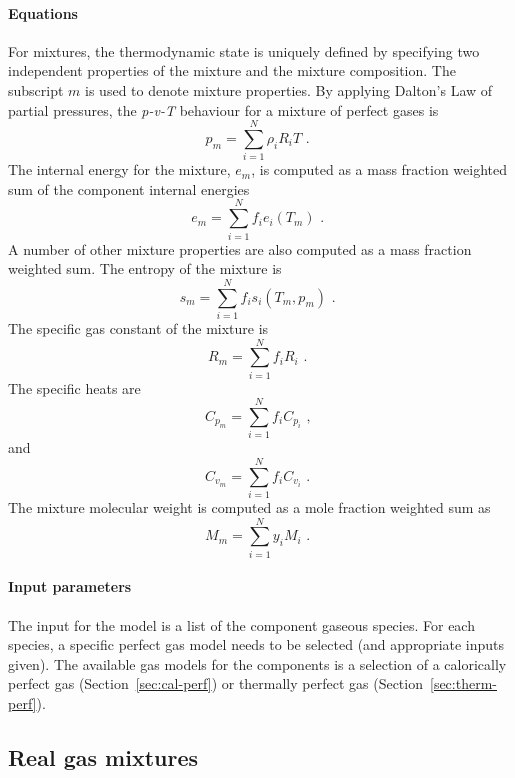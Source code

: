 \paragraph{Equations}
For mixtures, the thermodynamic state is uniquely defined
by specifying two independent properties of the mixture and the mixture
composition.
The subscript $m$ is used to denote mixture properties.
By applying Dalton's Law of partial pressures, the
\textit{p-v-T} behaviour for a mixture of perfect
gases is
\begin{equation}
 p_m = \sum_{i=1}^N \rho_i R_i T \text{ . }
\end{equation}
The internal energy for the mixture, $e_m$, is computed as
a mass fraction weighted sum of the component
internal energies
\begin{equation}
 e_m = \sum_{i=1}^N f_i e_i(T_m) \text{ . }
\end{equation}
A number of other mixture properties are also computed
as a mass fraction weighted sum.
The entropy of the mixture is
\begin{equation}
 s_m = \sum_{i=1}^N f_i s_i(T_m, p_m) \text{ . }
\end{equation}
The specific gas constant of the mixture is
\begin{equation}
 R_m = \sum_{i=1}^N f_i R_i \text{ . }
\end{equation}
The specific heats are
\begin{equation}
  C_{p_m} = \sum_{i=1}^N f_i C_{p_i} \text{ , }
\end{equation}
and
\begin{equation}
  C_{v_m} = \sum_{i=1}^N f_i C_{v_i} \text{ . }
\end{equation}
The mixture molecular weight is computed as a mole fraction
weighted sum as
\begin{equation}
  M_m = \sum_{i=1}^N y_i M_i \text{ . }
\end{equation}

\paragraph{Input parameters}
The input for the model is a list of the component gaseous species.
For each species, a specific perfect gas model needs to be selected
(and appropriate inputs given).
The available gas models for the components is a selection of a calorically perfect
gas (Section~\ref{sec:cal-perf}) or thermally perfect gas (Section~\ref{sec:therm-perf}).

\subsection{Real gas mixtures}
\label{sec:real-gas-mix}
